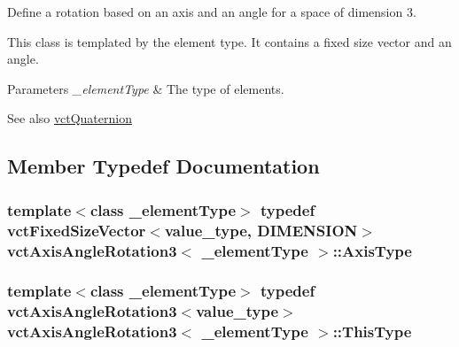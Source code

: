 Define a rotation based on an axis and an angle for a space of dimension 3. 

This class is templated by the element type. It contains a fixed size vector and an angle.


\begin{DoxyParams}{Parameters}
{\em \+\_\+element\+Type} & The type of elements.\\
\hline
\end{DoxyParams}
\begin{DoxySeeAlso}{See also}
\hyperlink{classvct_quaternion}{vct\+Quaternion} 
\end{DoxySeeAlso}


\subsection{Member Typedef Documentation}
\hypertarget{classvct_axis_angle_rotation3_a3178fd901bb60bb447711b9d5f7e7aae}{}
\subsubsection[{Axis\+Type}]{\setlength{\rightskip}{0pt plus 5cm}template$<$class \+\_\+element\+Type$>$ typedef {\bf vct\+Fixed\+Size\+Vector}$<$value\+\_\+type, {\bf D\+I\+M\+E\+N\+S\+I\+O\+N}$>$ {\bf vct\+Axis\+Angle\+Rotation3}$<$ \+\_\+element\+Type $>$\+::{\bf Axis\+Type}}\label{classvct_axis_angle_rotation3_a3178fd901bb60bb447711b9d5f7e7aae}
\hypertarget{classvct_axis_angle_rotation3_af654a8037b7b82a378f69cb1bfd9b8dd}{}
\subsubsection[{This\+Type}]{\setlength{\rightskip}{0pt plus 5cm}template$<$class \+\_\+element\+Type$>$ typedef {\bf vct\+Axis\+Angle\+Rotation3}$<$value\+\_\+type$>$ {\bf vct\+Axis\+Angle\+Rotation3}$<$ \+\_\+element\+Type $>$\+::{\bf This\+Type}}\label{classvct_axis_angle_rotation3_af654a8037b7b82a378f69cb1bfd9b8dd}
\hypertarget{classvct_axis_angle_rotation3_a7765132e2cf950c6598eb4d75e6fc297}{}
